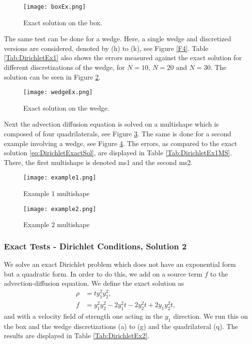 	\begin{figure}[h]
		\centering
		\texttt{[image: boxEx.png]}
		\caption{Exact solution on the box.} 
		\label{F3}
	\end{figure}


The same test can be done for a wedge. Here, a single wedge and discretized versions are considered, denoted by (h) to (k), see Figure \ref{F4}. Table \ref{Tab:DirichletEx1} also shows the errors measured against the exact solution for different discretizations of the wedge, for $N = 10$, $N = 20$ and $N = 30$. The solution can be seen in Figure \ref{F5}.


\begin{figure}[h]
	\centering
	\texttt{[image: wedgeEx.png]}
	\caption{Exact solution on the wedge.} 
	\label{F5}
\end{figure}

Next the advection diffusion equation is solved on a multishape which is composed of four quadrilaterals, see Figure \ref{F6}.  The same is done for a second example involving a wedge, see Figure \ref{F7}.  The errors, as compared to the exact solution \eqref{eq:DirichletExactSol}, are displayed in Table \ref{Tab:DirichletEx1MS}. There, the first multishape is denoted ms1 and the second ms2.
\begin{figure}[h]
	\centering
	\texttt{[image: example1.png]}
	\caption{Example 1 multishape} 
	\label{F6}
\end{figure}


\begin{figure}[h]
	\centering
	\texttt{[image: example2.png]}
	\caption{Example 2 multishape} 
	\label{F7}
\end{figure}




\subsubsection*{Exact Tests - Dirichlet Conditions, Solution 2}

We solve an exact Dirichlet problem which does not have an exponential form but a quadratic form. In order to do this, we add on a source term $f$ to the advection-diffusion equation.
We define the exact solution as
\begin{align*}
	\rho &= t y_1^2 y_2^2,\\
	f &= y_1^2 y_2^2 - 2 y_1^2 t - 2 y_2^2 t + 2 y_1 y_2^2 t,
\end{align*}
and with a velocity field of strength one acting in the $y_1$ direction.
We run this on the box and the wedge discretizations (a) to (g) and the quadrilateral (q). The results are displayed in Table \ref{Tab:DirichletEx2}.



